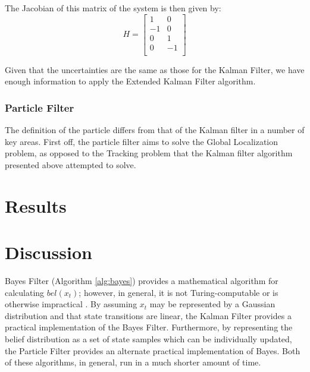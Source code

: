 \documentclass[english]{article}
\begin{document}
The Jacobian of this matrix of the system is then given by:
\begin{equation}
H = \left[ \begin{array}{cc}
1&0\\
-1&0\\
0&1\\
0&-1\\ \end{array} \right]
\end{equation}

Given that the uncertainties are the same as those for the Kalman Filter, we have enough information to apply the Extended Kalman Filter algorithm.

\subsubsection{Particle Filter}
The definition of the particle differs from that of the Kalman filter in a number of key areas. First off, the particle filter aims to solve the Global Localization problem, as opposed to the Tracking problem that the Kalman filter algorithm presented above attempted to solve. 

\section{Results}

\section{Discussion}

Bayes Filter (Algorithm \ref{alg:bayes}) provides a mathematical algorithm for calculating $bel(x_t)$; however, in general, it is not Turing-computable or is otherwise impractical \cite{probrob}. By assuming $x_t$ may be represented by a Gaussian distribution and that state transitions are linear, the Kalman Filter provides a practical implementation of the Bayes Filter. Furthermore, by representing the belief distribution as a set of state samples which can be individually updated, the Particle Filter provides an alternate practical implementation of Bayes. Both of these algorithms, in general, run in a much shorter amount of time.
\end{document}
